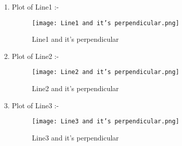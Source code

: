 \documentclass[journal,12pt,twocolumn]{IEEEtran}
\begin{document}
\begin{enumerate}[label=\alph*.]
    \item Plot of Line1 :-

\begin{figure}[H]
\centering
\texttt{[image: Line1 and it's perpendicular.png]}
\caption{Line1 and it's perpendicular}
\label{fig:circle}	
\end{figure}


 \item Plot of Line2 :-
\begin{figure}[H]
\centering
\texttt{[image: Line2 and it's perpendicular.png]}
\caption{Line2 and it's perpendicular}
\label{fig:circle}	
\end{figure}
 \item Plot of Line3 :-
\begin{figure}[H]
\centering
\texttt{[image: Line3 and it's perpendicular.png]}
\caption{Line3 and it's perpendicular}
\label{fig:circle}	
\end{figure}

\end{enumerate}
\end{document}
